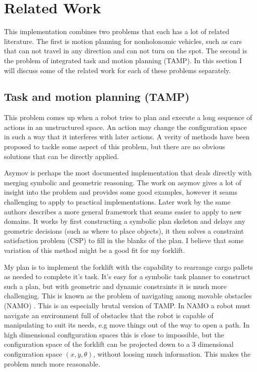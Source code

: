 \documentclass[letterpaper, 10 pt, conference]{ieeeconf}  %
\begin{document}
\label{related_work}
\section{Related Work}

This implementation combines two problems that each has a lot of related literature. The first is motion planning for nonholonomic vehicles, such as cars that can not travel in any direction and can not turn on the spot. The second is the problem of integrated task and motion planning (TAMP). In this section I will discuss some of the related work for each of these problems separately.

\subsection{Task and motion planning (TAMP)}

This problem comes up when a robot tries to plan and execute a long sequence of actions in an unstructured space. An action may change the configuration space in such a way that it interferes with later actions. A verity of methods have been proposed to tackle some aspect of this problem, but there are no obvious solutions that can be directly applied. 

Asymov\cite{asymov}\cite{asymov2} is perhaps the most documented implementation that deals directly with merging symbolic and geometric reasoning. The work on asymov gives a lot of insight into the problem and provides some good examples, however it seams challenging to apply to practical implementations. Later work by the same authors \cite{tomas_14} describes a more general framework that seams easier to apply to new domains. It works by first constructing a symbolic plan skeleton and delays any geometric decisions (such as where to place objects), it then solves a constraint satisfaction problem (CSP) to fill in the blanks of the plan. I believe that some variation of this method might be a good fit for my forklift.

My plan is to implement the forklift with the capability to rearrange cargo pallets as needed to complete it's task. It's easy for a symbolic task planner to construct such a plan, but with geometric and dynamic constraints it is much more challenging. This is known as the problem of navigating among movable obstacles (NAMO) \cite{stilman_namo}\cite{stilman_namo2}\cite{stilman_namo3}. This is an especially brutal version of TAMP. In NAMO a robot must navigate an environment full of obstacles that the robot is capable of manipulating to suit its needs, e.g move things out of the way to open a path. In high dimensional configuration spaces this is close to impossible, but the configuration space of the forklift can be projected down to a 3 dimensional configuration space $(x, y, \theta)$, without loosing much information. This makes the problem much more reasonable.
\end{document}
